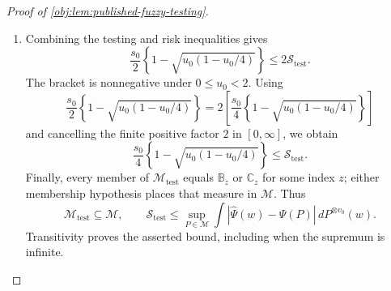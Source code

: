 \documentclass[11pt]{article}
\begin{document}
\begin{proof}[Proof of \cref{obj:lem:published-fuzzy-testing}]
\begin{enumerate}
Integrating these inequalities under the component product laws gives
\[
\begin{aligned}
\frac{s_0}{2}\mathbb B_z^{\otimes v_0}(\mathcal A_{\mathrm{test}})
&\le\mathcal R_{\mathrm{test}}(\mathbb B_z)
\le\mathcal S_{\mathrm{test}},\\
\frac{s_0}{2}\mathbb C_z^{\otimes v_0}(\mathcal A_{\mathrm{test}}^c)
&\le\mathcal R_{\mathrm{test}}(\mathbb C_z)
\le\mathcal S_{\mathrm{test}}.
\end{aligned}
\]
Kernel event probabilities are measurable functions of the index. Integrating
their bounds against the probability prior therefore gives
\[
\begin{aligned}
\frac{s_0}{2}\mathbb B_{\mathrm{mix}}(\mathcal A_{\mathrm{test}})
&=\int\frac{s_0}{2}
  \mathbb B_z^{\otimes v_0}(\mathcal A_{\mathrm{test}})\,d\omega(z)
\le\int\mathcal S_{\mathrm{test}}\,d\omega
=\mathcal S_{\mathrm{test}},\\
\frac{s_0}{2}\mathbb C_{\mathrm{mix}}(\mathcal A_{\mathrm{test}}^c)
&=\int\frac{s_0}{2}
  \mathbb C_z^{\otimes v_0}(\mathcal A_{\mathrm{test}}^c)\,d\omega(z)
\le\int\mathcal S_{\mathrm{test}}\,d\omega
=\mathcal S_{\mathrm{test}}.
\end{aligned}
\]
Adding yields the extended nonnegative inequality
\[
\frac{s_0}{2}
\left\{
\mathbb B_{\mathrm{mix}}(\mathcal A_{\mathrm{test}})
+\mathbb C_{\mathrm{mix}}(\mathcal A_{\mathrm{test}}^c)
\right\}
\le2\mathcal S_{\mathrm{test}}.
\]

\item Combining the testing and risk inequalities gives
\[
\frac{s_0}{2}\left\{1-\sqrt{u_0(1-u_0/4)}\right\}
\le2\mathcal S_{\mathrm{test}}.
\]
The bracket is nonnegative under \(0\le u_0<2\). Using
\[
\frac{s_0}{2}\left\{1-\sqrt{u_0(1-u_0/4)}\right\}
=
2\left[
\frac{s_0}{4}\left\{1-\sqrt{u_0(1-u_0/4)}\right\}
\right]
\]
and cancelling the finite positive factor \(2\) in \([0,\infty]\), we obtain
\[
\frac{s_0}{4}\left\{1-\sqrt{u_0(1-u_0/4)}\right\}
\le\mathcal S_{\mathrm{test}}.
\]
Finally, every member of \(\mathcal M_{\mathrm{test}}\) equals
\(\mathbb B_z\) or \(\mathbb C_z\) for some index \(z\); either membership
hypothesis places that measure in \(\mathcal M\). Thus
\[
\mathcal M_{\mathrm{test}}\subseteq\mathcal M,
\qquad
\mathcal S_{\mathrm{test}}
\le
\sup_{P\in\mathcal M}
\int|\widehat\Psi(w)-\Psi(P)|\,dP^{\otimes v_0}(w).
\]
Transitivity proves the asserted bound, including when the supremum is infinite.
\end{enumerate}
\end{proof}
\end{document}
